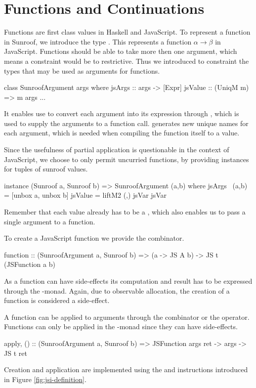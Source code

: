  
\section{Functions and Continuations}
\label{sec:functions-continuations}

Functions are first class values in Haskell and JavaScript.
To represent a function in Sunroof, we introduce the type 
. This represents a function
$\alpha \rightarrow \beta$ in JavaScript. Functions should
be able to take more then one argument, which means a 
 constraint would be to restrictive.
Thus we introduced  to constraint the 
types that may be used as arguments for functions.
\begin{Code}
class SunroofArgument args where
  jsArgs   :: args -> [Expr]
  jsValue  :: (UniqM m) => m args
  ...
\end{Code}
It enables use to convert each argument into its expression
through , which is used to supply the
arguments to a function call.  generates
new unique names for each argument, which is needed when compiling
the function itself to a value. 

Since the usefulness of partial application is questionable in
the context of JavaScript, we choose to only permit uncurried functions,
by providing instances for tuples of sunroof values.
\begin{Code}
instance (Sunroof a, Sunroof b) => SunroofArgument (a,b) where
  jsArgs ~(a,b) = [unbox a, unbox b]
  jsValue = liftM2 (,) jsVar jsVar
\end{Code}
Remember that each  value already has to be 
a , which also enables us to pass a single argument
to a function. 

To create a JavaScript function we provide the  combinator.
\begin{Code}
function :: (SunroofArgument a, Sunroof b) 
         => (a -> JS A b)  -> JS t (JSFunction a b)
\end{Code}
As a function can have side-effects its computation and result has to be 
expressed through the \JS-monad. Again, due to observable allocation,
the creation of a function is considered a side-effect.

A function can be applied to arguments through the  combinator
or the \Src{\$\$} operator.
Functions can only be applied in the \JS-monad since they can have side-effects.
\begin{Code}
apply, ($$) :: (SunroofArgument a, Sunroof b) 
            => JSFunction args ret -> args -> JS t ret
\end{Code}
Creation and application are implemented using the 
and  instructions introduced in 
Figure \ref{fig:jsi-definition}.

